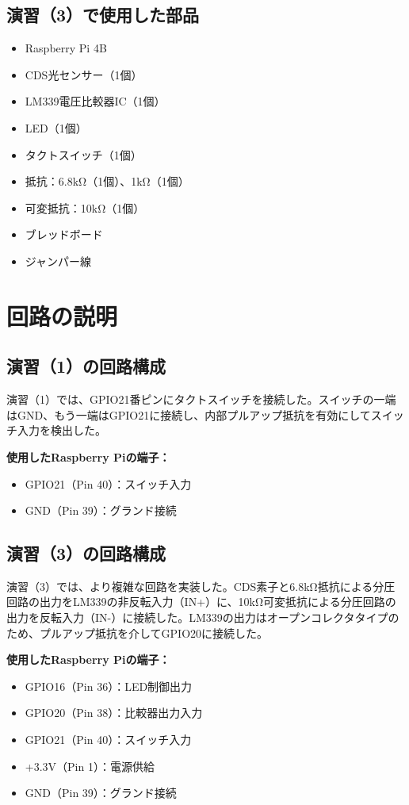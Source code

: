 \documentclass[a4paper,11pt,dvipdfmx]{jsarticle}
\begin{document}
\subsection{演習（3）で使用した部品}
\begin{itemize}
\item Raspberry Pi 4B
\item CDS光センサー（1個）
\item LM339電圧比較器IC（1個）
\item LED（1個）
\item タクトスイッチ（1個）
\item 抵抗：6.8kΩ（1個）、1kΩ（1個）
\item 可変抵抗：10kΩ（1個）
\item ブレッドボード
\item ジャンパー線
\end{itemize}

\section{回路の説明}
\subsection{演習（1）の回路構成}
演習（1）では、GPIO21番ピンにタクトスイッチを接続した。スイッチの一端はGND、もう一端はGPIO21に接続し、内部プルアップ抵抗を有効にしてスイッチ入力を検出した。

\textbf{使用したRaspberry Piの端子：}
\begin{itemize}
\item GPIO21（Pin 40）：スイッチ入力
\item GND（Pin 39）：グランド接続
\end{itemize}

\subsection{演習（3）の回路構成}
演習（3）では、より複雑な回路を実装した。CDS素子と6.8kΩ抵抗による分圧回路の出力をLM339の非反転入力（IN+）に、10kΩ可変抵抗による分圧回路の出力を反転入力（IN-）に接続した。LM339の出力はオープンコレクタタイプのため、プルアップ抵抗を介してGPIO20に接続した。

\textbf{使用したRaspberry Piの端子：}
\begin{itemize}
\item GPIO16（Pin 36）：LED制御出力
\item GPIO20（Pin 38）：比較器出力入力
\item GPIO21（Pin 40）：スイッチ入力
\item +3.3V（Pin 1）：電源供給
\item GND（Pin 39）：グランド接続
\end{itemize}
\end{document}
